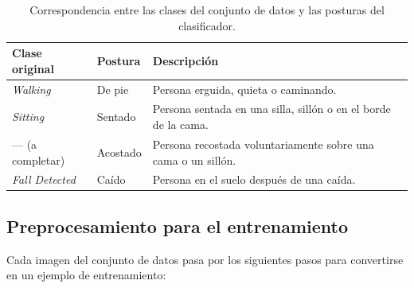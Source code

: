\documentclass[12pt,a4paper,oneside]{book}
\theoremstyle{plain}
\theoremstyle{definition}
\theoremstyle{remark}
\begin{document}
\begin{table}[htbp]
\centering
\caption{Correspondencia entre las clases del conjunto de datos y las posturas del clasificador.}
\label{tab:clases-postura}
\small
\begin{tabular}{L{3.2cm}L{2.6cm}L{6.4cm}}
\toprule
\textbf{Clase original} & \textbf{Postura} & \textbf{Descripción} \\
\midrule
\textit{Walking} & De pie & Persona erguida, quieta o caminando. \\
\addlinespace
\textit{Sitting} & Sentado & Persona sentada en una silla, sillón o en el borde de la cama. \\
\addlinespace
--- (a completar) & Acostado & Persona recostada voluntariamente sobre una cama o un sillón. \\
\addlinespace
\textit{Fall Detected} & Caído & Persona en el suelo después de una caída. \\
\bottomrule
\end{tabular}
\end{table}
 
\subsection{Preprocesamiento para el entrenamiento}
 
Cada imagen del conjunto de datos pasa por los siguientes pasos para convertirse en un ejemplo de entrenamiento:
\end{document}
